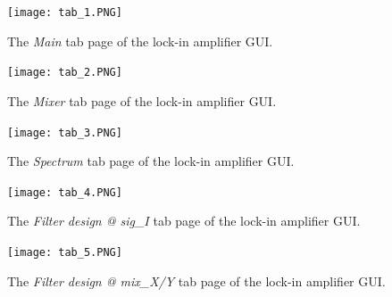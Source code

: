 \documentclass{article}
\begin{document}
\begin{figure}[h]\label{fig:tab_1}
\centering
\texttt{[image: tab\_1.PNG]}
\caption{The \textit{Main} tab page of the lock-in amplifier GUI.}
\end{figure}

\begin{figure}[h]\label{fig:tab_2}
\centering
\texttt{[image: tab\_2.PNG]}
\caption{The \textit{Mixer} tab page of the lock-in amplifier GUI.}
\end{figure}

\begin{figure}[h]\label{fig:tab_3}
\centering
\texttt{[image: tab\_3.PNG]}
\caption{The \textit{Spectrum} tab page of the lock-in amplifier GUI.}
\end{figure}

\begin{figure}[h]\label{fig:tab_4}
\centering
\texttt{[image: tab\_4.PNG]}
\caption{The \textit{Filter design @ sig\_I} tab page of the lock-in amplifier GUI.}
\end{figure}

\begin{figure}[h]\label{fig:tab_5}
\centering
\texttt{[image: tab\_5.PNG]}
\caption{The \textit{Filter design @ mix\_X/Y} tab page of the lock-in amplifier GUI.}
\end{figure}
\end{document}
